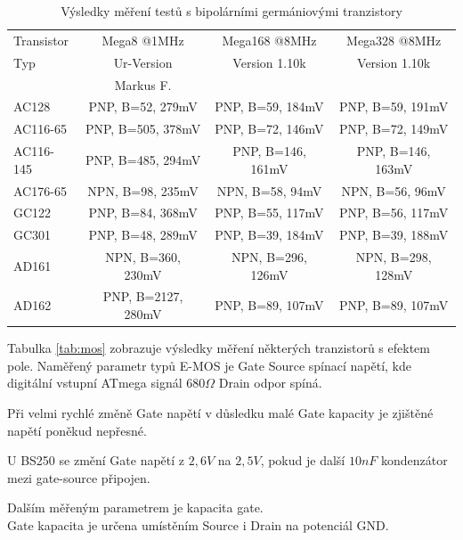 \begin{table}[H]
  \begin{center}
    \begin{tabular}{| l | c | c | c |}
    \hline
 Transistor & Mega8 @1MHz          & Mega168 @8MHz       & Mega328 @8MHz    \\
    Typ     & Ur-Version          & Version 1.10k       & Version 1.10k  \\
            & Markus F.           &                     &        \\
    \hline
    \hline
AC128       & PNP, B=52, 279mV    & PNP, B=59, 184mV    & PNP, B=59, 191mV    \\
    \hline
AC116-65    & PNP, B=505, 378mV   & PNP, B=72, 146mV    & PNP, B=72, 149mV    \\
    \hline
AC116-145   & PNP, B=485, 294mV   & PNP, B=146, 161mV    & PNP, B=146, 163mV   \\
    \hline
AC176-65    & NPN, B=98, 235mV    & NPN, B=58, 94mV    & NPN, B=56, 96mV     \\
    \hline
GC122       & PNP, B=84, 368mV    & PNP, B=55, 117mV    & PNP, B=56, 117mV    \\
    \hline
GC301       & PNP, B=48, 289mV    & PNP, B=39, 184mV    & PNP, B=39, 188mV    \\
    \hline
AD161       & NPN, B=360, 230mV   & NPN, B=296, 126mV   & NPN, B=298, 128mV    \\
    \hline
AD162       & PNP, B=2127, 280mV  & PNP, B=89, 107mV    & PNP, B=89, 107mV    \\
    \hline
    \end{tabular}
  \end{center}
  \caption{Výsledky měření testů s bipolárními germániovými tranzistory}
  \label{tab:germanium} 
\end{table}

Tabulka \ref{tab:mos} zobrazuje výsledky měření některých tranzistorů s efektem pole.
Naměřený parametr typů E-MOS je Gate Source spínací napětí, kde digitální vstupní ATmega signál \(680\Omega\) Drain odpor spíná.

Při velmi rychlé změně Gate napětí v důsledku malé Gate kapacity je zjištěné napětí poněkud nepřesné.

U BS250 se změní Gate napětí z \(2,6V\) na \(2,5V\), pokud je další \(10nF\) kondenzátor mezi gate-source připojen.

Dalším měřeným parametrem je kapacita gate.\\
Gate kapacita je určena umístěním Source i Drain na potenciál GND.

